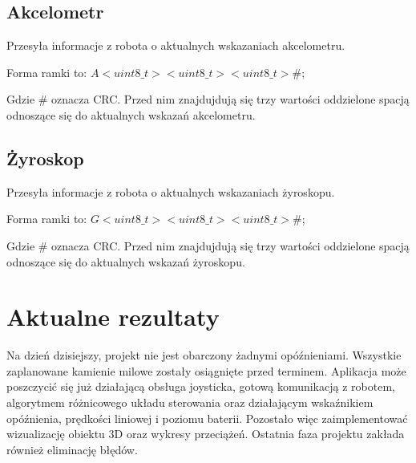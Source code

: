 \documentclass[12pt,a4paper,polish]{article}
\begin{document}
  \subsection{Akcelometr}
  Przesyła informacje z robota o aktualnych wskazaniach akcelometru.

  Forma ramki to: $A<uint8\_t> <uint8\_t> <uint8\_t>\#$;
  \newline

  Gdzie \# oznacza CRC. Przed nim znajdujdują się trzy wartości oddzielone spacją
  odnoszące się do aktualnych wskazań akcelometru.


  \subsection{Żyroskop}
  Przesyła informacje z robota o aktualnych wskazaniach żyroskopu.

  Forma ramki to: $G<uint8\_t> <uint8\_t> <uint8\_t>\#$;
  \newline

  Gdzie \# oznacza CRC. Przed nim znajdujdują się trzy wartości oddzielone spacją
  odnoszące się do aktualnych wskazań żyroskopu.


  \section{Aktualne rezultaty}
  Na dzień dzisiejszy, projekt nie jest obarczony żadnymi opóźnieniami. Wszystkie 
  zaplanowane kamienie milowe zostały osiągnięte przed terminem. Aplikacja może 
  poszczycić się już działającą obsługa joysticka, gotową komunikacją z robotem,
  algorytmem różnicowego układu sterowania oraz działającym wskaźnikiem opóźnienia,
  prędkości liniowej i poziomu baterii. Pozostało więc zaimplementować wizualizację
  obiektu 3D oraz wykresy przeciążeń. Ostatnia faza projektu zakłada również eliminację
  błędów.

  


\end{document}

